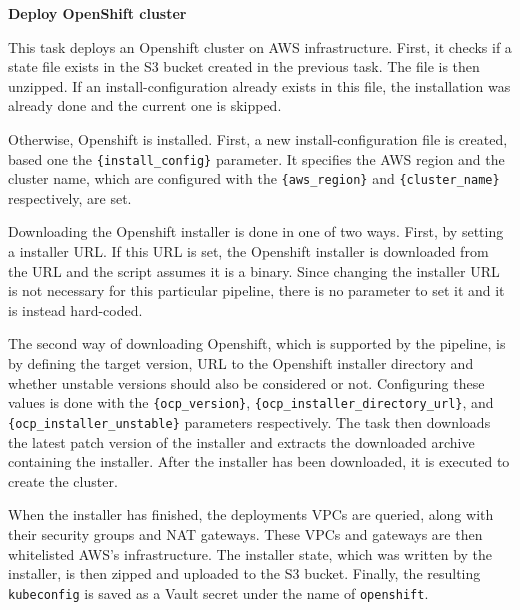 \textbf{Deploy OpenShift cluster}

This task deploys an Openshift cluster on AWS infrastructure.
First, it checks if a state file exists in the S3 bucket created in the previous task.
The file is then unzipped.
If an install-configuration already exists in this file, the installation was already done and the current one is skipped.

Otherwise, Openshift is installed.
First, a new install-configuration file is created, based one the \verb|{install_config}| parameter.
It specifies the AWS region and the cluster name, which are configured with the \verb|{aws_region}| and \verb|{cluster_name}| respectively, are set.

Downloading the Openshift installer is done in one of two ways.
First, by setting a installer URL.
If this URL is set, the Openshift installer is downloaded from the URL and the script assumes it is a binary.
Since changing the installer URL is not necessary for this particular pipeline, there is no parameter to set it and it is instead hard-coded.

The second way of downloading Openshift, which is supported by the pipeline, is by defining the target version, URL to the Openshift installer directory and whether unstable versions should also be considered or not.
Configuring these values is done with the \verb|{ocp_version}|, \verb|{ocp_installer_directory_url}|, and \verb|{ocp_installer_unstable}| parameters respectively.
The task then downloads the latest patch version of the installer and extracts the downloaded archive containing the installer.
After the installer has been downloaded, it is executed to create the cluster.

When the installer has finished, the deployments VPCs are queried, along with their security groups and NAT gateways.
These VPCs and gateways are then whitelisted AWS's infrastructure.
The installer state, which was written by the installer, is then zipped and uploaded to the S3 bucket.
Finally, the resulting \verb|kubeconfig| is saved as a Vault secret under the name of \verb|openshift|.

